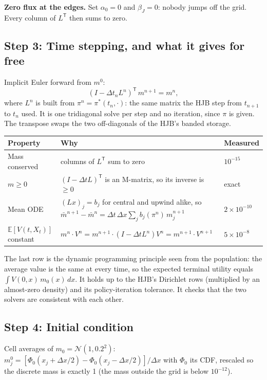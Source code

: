 \documentclass[11pt]{article}
\newcommand{\E}{\mathbb{E}}
\newcommand{\mb}{\bar m}
\begin{document}
\textbf{Zero flux at the edges.} Set $\alpha_0=0$ and $\beta_J=0$: nobody jumps off the grid.
Every column of $L^{\mathsf T}$ then sums to zero.

\subsection*{Step 3: Time stepping, and what it gives for free}
Implicit Euler forward from $m^0$:
\[
  \boxed{\;(I-\Delta t_n L^n)^{\mathsf T}\,m^{n+1} = m^n,\;}
\]
where $L^n$ is built from $\pi^n=\pi^*(t_n,\cdot)$: the same matrix the HJB step from
$t_{n+1}$ to $t_n$ used. It is one tridiagonal solve per step and no iteration, since $\pi$ is
given. The transpose swaps the two off-diagonals of the HJB's banded storage.
\begin{center}
\small
\begin{tabular}{@{}lp{}l@{}}
\toprule
Property & Why & Measured \\
\midrule
Mass conserved & columns of $L^{\mathsf T}$ sum to zero & $10^{-15}$ \\
$m\ge0$ & $(I-\Delta tL)^{\mathsf T}$ is an M-matrix, so its inverse is $\ge0$ & exact \\
Mean ODE & $(Lx)_j=b_j$ for central and upwind alike, so
  $\mb^{n+1}-\mb^n=\Delta t\,\Delta x\sum_jb_j(\pi^n)\,m_j^{n+1}$ & $2\times10^{-10}$ \\
$\E[V(t,X_t)]$ constant & $m^n\!\cdot V^n = m^{n+1}\!\cdot(I-\Delta tL^n)V^n = m^{n+1}\!\cdot V^{n+1}$
  & $5\times10^{-8}$ \\
\bottomrule
\end{tabular}
\end{center}
The last row is the dynamic programming principle seen from the population: the average value
is the same at every time, so the expected terminal utility equals $\int V(0,x)\,m_0(x)\,dx$. It
holds up to the HJB's Dirichlet rows (multiplied by an almost-zero density) and its
policy-iteration tolerance. It checks that the two solvers are consistent with each other.

\subsection*{Step 4: Initial condition}
Cell averages of $m_0=\mathcal N(1,0.2^2)$: $m_j^0=[\Phi_0(x_j+\Delta x/2)-\Phi_0(x_j-\Delta x/2)]/\Delta x$
with $\Phi_0$ its CDF, rescaled so the discrete mass is exactly 1 (the mass outside the grid is
below $10^{-12}$).
\end{document}
